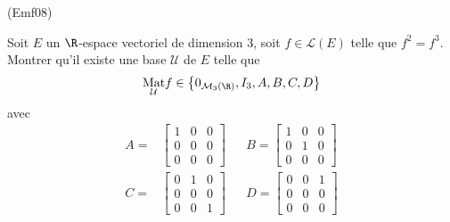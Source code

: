 \begin{tiny}(Emf08)\end{tiny}
Soit $E$ un $\R$-espace vectoriel de dimension 3, soit $f\in \mathcal{L}(E)$ telle que $f^{2}=f^{3}$. Montrer qu'il existe une base $\mathcal{U}$ de $E$ telle que 
\begin{displaymath}
\underset{\mathcal{U}}{\mathrm{Mat}}f\in
\left\{ 0_{\mathcal{M}_{3}(\R)},I_{3},A,B,C,D\right\}  
\end{displaymath}
avec
\begin{align*}
A =&\left[
\begin{array}{ccc}
1 & 0 & 0 \\
0 & 0 & 0 \\
0 & 0 & 0
\end{array}
\right] & & B=\left[
\begin{array}{ccc}
1 & 0 & 0 \\
0 & 1 & 0 \\
0 & 0 & 0
\end{array}
\right] \\
C =&\left[
\begin{array}{ccc}
0 & 1 & 0 \\
0 & 0 & 0 \\
0 & 0 & 1
\end{array}
\right] & &  D=\left[
\begin{array}{ccc}
0 & 0 & 1 \\
0 & 0 & 0 \\
0 & 0 & 0
\end{array}
\right]
\end{align*}
